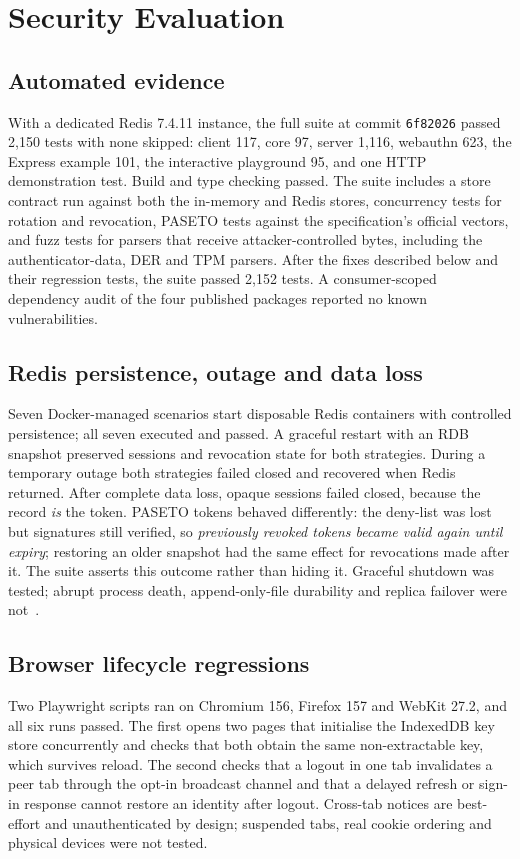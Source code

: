 \documentclass[conference]{IEEEtran}
\begin{document}
\section{Security Evaluation}
\label{sec:security}

\subsection{Automated evidence}
With a dedicated Redis 7.4.11 instance, the full suite at commit \texttt{6f82026} passed 2,150 tests with none skipped: client 117, core 97, server 1,116, webauthn 623, the Express example 101, the interactive playground 95, and one HTTP demonstration test. Build and type checking passed. The suite includes a store contract run against both the in-memory and Redis stores, concurrency tests for rotation and revocation, PASETO tests against the specification's official vectors, and fuzz tests for parsers that receive attacker-controlled bytes, including the authenticator-data, DER and TPM parsers. After the fixes described below and their regression tests, the suite passed 2,152 tests. A consumer-scoped dependency audit of the four published packages reported no known vulnerabilities.

\subsection{Redis persistence, outage and data loss}
Seven Docker-managed scenarios start disposable Redis containers with controlled persistence; all seven executed and passed. A graceful restart with an RDB snapshot preserved sessions and revocation state for both strategies. During a temporary outage both strategies failed closed and recovered when Redis returned. After complete data loss, opaque sessions failed closed, because the record \emph{is} the token. PASETO tokens behaved differently: the deny-list was lost but signatures still verified, so \emph{previously revoked tokens became valid again until expiry}; restoring an older snapshot had the same effect for revocations made after it. The suite asserts this outcome rather than hiding it. Graceful shutdown was tested; abrupt process death, append-only-file durability and replica failover were not~\cite{redispersistence}.

\subsection{Browser lifecycle regressions}
Two Playwright scripts ran on Chromium 156, Firefox 157 and WebKit 27.2, and all six runs passed. The first opens two pages that initialise the IndexedDB key store concurrently and checks that both obtain the same non-extractable key, which survives reload. The second checks that a logout in one tab invalidates a peer tab through the opt-in broadcast channel and that a delayed refresh or sign-in response cannot restore an identity after logout. Cross-tab notices are best-effort and unauthenticated by design; suspended tabs, real cookie ordering and physical devices were not tested.
\end{document}
